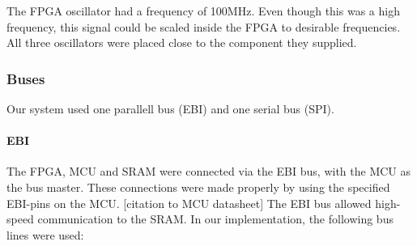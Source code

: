 The FPGA oscillator had a frequency of 100MHz.
Even though this was a high frequency, this signal could be scaled inside the FPGA to desirable frequencies.
All three oscillators were placed close to the component they supplied.

\subsubsection{Buses}
Our system used one parallell bus (EBI) and one serial bus (SPI).

\paragraph{EBI}
The FPGA, MCU and SRAM were connected via the EBI bus, with the MCU as the bus master. 
These connections were made properly by using the specified EBI-pins on the MCU. [citation to MCU datasheet]
The EBI bus allowed high-speed communication to the SRAM.
In our implementation, the following bus lines were used:
